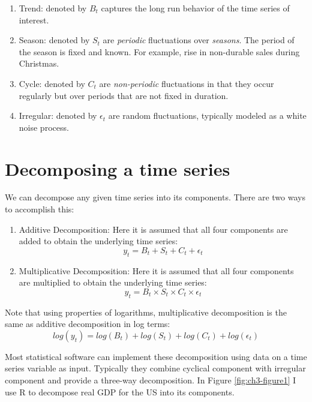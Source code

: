 \documentclass[]{book}
\theoremstyle{definition}
\theoremstyle{definition}
\theoremstyle{definition}
\theoremstyle{remark}
\begin{document}
\begin{enumerate}
\def\labelenumi{\arabic{enumi}.}
\item
  Trend: denoted by \(B_t\) captures the long run behavior of the time series of interest.
\item
  Season: denoted by \(S_t\) are \emph{periodic} fluctuations over \emph{seasons}. The period of the season is fixed and known. For example, rise in non-durable sales during Christmas.
\item
  Cycle: denoted by \(C_t\) are \emph{non-periodic} fluctuations in that they occur regularly but over periods that are not fixed in duration.
\item
  Irregular: denoted by \(\epsilon_t\) are random fluctuations, typically modeled as a white noise process.
\end{enumerate}

\hypertarget{decomposing-a-time-series}{%
\section{Decomposing a time series}\label{decomposing-a-time-series}}

We can decompose any given time series into its components. There are two ways to accomplish this:

\begin{enumerate}
\def\labelenumi{\arabic{enumi}.}
\item
  Additive Decomposition: Here it is assumed that all four components are added to obtain the underlying time series:
  \begin{equation}
  y_t= B_t+S_t+C_t +\epsilon_t
  \end{equation}
\item
  Multiplicative Decomposition: Here it is assumed that all four components are multiplied to obtain the underlying time series:
  \begin{equation}
  y_t= B_t \times S_t \times C_t \times \epsilon_t
  \end{equation}
\end{enumerate}

Note that using properties of logarithms, multiplicative decomposition is the same as additive decomposition in log terms:
\begin{equation}
log(y_t)= log(B_t) + log(S_t) + log(C_t) + log(\epsilon_t)
\end{equation}

Most statistical software can implement these decomposition using data on a time series variable as input. Typically they combine cyclical component with irregular component and provide a three-way decomposition. In Figure \ref{fig:ch3-figure1} I use R to decompose real GDP for the US into its components.
\end{document}
